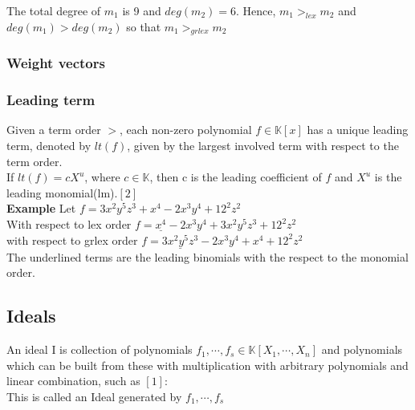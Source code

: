 The total degree of $m_{1}$ is 9 and $deg(m_{2})=6$. Hence, $m_{1}>_{lex} m_{2}$ and
$deg(m_{1})>deg(m_{2})$ so that $m_{1}>_{grlex} m_{2}$   

\subsubsection{Weight vectors} 

\subsubsection{Leading term}

Given a term order $>$, each non-zero polynomial $f \in \mathbb{K}\left[ x\right] $ has a unique leading term, denoted by $lt(f)$, given by the largest involved term with respect to the term order.\\
If $lt(f) = cX^{u}$, where $c \in \mathbb{K}$, then c is the leading coefficient of $f$ and $X^{u}$ is the leading monomial(lm).$\left[ 2\right]$\\

\textbf{Example} Let $ f = 3x^{2}y^{5}z^{3} + x^{4} -2x^{3}y^{4} + 12^{2}z^{2}$ \\
With respect to lex order $f = \underline{x^{4}} -2x^{3}y^{4} + 3x^{2}y^{5}z^{3} + 12^{2}z^{2} $ \\
with respect to grlex order $f = \underline{3x^{2}y^{5}z^{3}} -2x^{3}y^{4} + x^{4}+ 12^{2}z^{2}$  \\
The underlined terms are the leading binomials with the respect to the monomial order.


\subsection{Ideals}

\begin{env_definition}[Ideal]
An ideal I is collection of polynomials $f_{1}, \cdots , f_{s} \in \mathbb{K}\left[X_{1}, \cdots, X_{n}\right] $ and polynomials which can be built from these with multiplication with arbitrary polynomials and linear combination, such as $\left[1 \right]  $: \\
This is called an Ideal generated by $f_{1}, \cdots , f_{s}$ \\
\end{env_definition}

